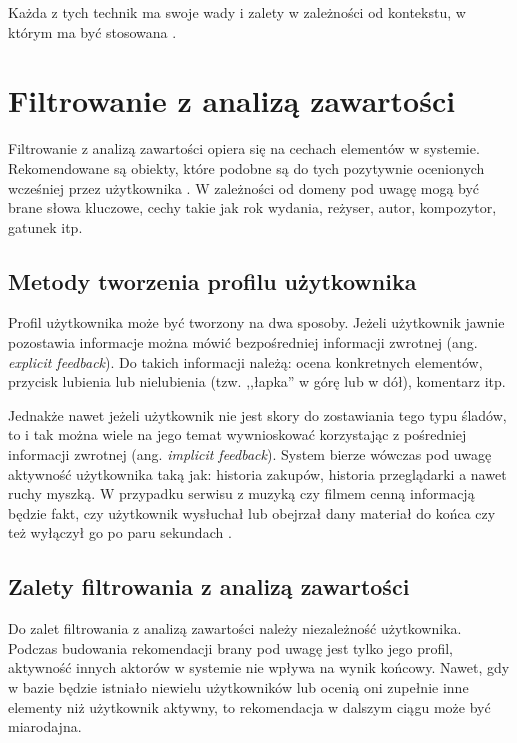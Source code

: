 \documentclass[twoside]{iisthesis}
\begin{document}
	 Każda z tych technik ma swoje wady i zalety w zależności od kontekstu, w którym ma być stosowana \cite{id:IntroductionToRecommenderSystemsHandbook}. 
	 
	 
	 \section{Filtrowanie z analizą zawartości}
	 
	 Filtrowanie z analizą zawartości opiera się na cechach elementów w systemie. Rekomendowane są obiekty, które podobne są do tych pozytywnie ocenionych wcześniej przez użytkownika \cite{id:huynh2012modeling}. W zależności od domeny pod uwagę mogą być brane słowa kluczowe, cechy takie jak rok wydania, reżyser, autor, kompozytor, gatunek itp.
	 
	 \subsection{Metody tworzenia profilu użytkownika}
	 \label{ss:metody_tworzenia_profilu_uzytkownika}
	 
	 Profil użytkownika może być tworzony na dwa sposoby. Jeżeli użytkownik jawnie pozostawia informacje można mówić bezpośredniej informacji zwrotnej (ang. \textit{explicit feedback}). Do takich informacji należą: ocena konkretnych elementów, przycisk lubienia lub nielubienia (tzw. ,,łapka'' w górę lub w dół), komentarz itp. 
	 
	 Jednakże nawet jeżeli użytkownik nie jest skory do zostawiania tego typu śladów, to i tak można wiele na jego temat wywnioskować korzystając z pośredniej informacji zwrotnej (ang. \textit{implicit feedback}). System bierze wówczas pod uwagę aktywność użytkownika taką jak: historia zakupów, historia przeglądarki a nawet ruchy myszką. W przypadku serwisu z muzyką czy filmem cenną informacją będzie fakt, czy użytkownik wysłuchał lub obejrzał dany materiał do końca czy też wyłączył go po paru sekundach \cite{id:AdvancesInCollaborativeFiltering,id:ContentBasedRecommenderSystemsState}.
	 
	 \subsection{Zalety filtrowania z analizą zawartości}
	 
	 Do zalet filtrowania z analizą zawartości należy niezależność użytkownika. Podczas budowania rekomendacji brany pod uwagę jest tylko jego profil, aktywność innych aktorów w systemie nie wpływa na wynik końcowy. Nawet, gdy w bazie będzie istniało niewielu użytkowników lub ocenią oni zupełnie inne elementy niż użytkownik aktywny, to rekomendacja w dalszym ciągu może być miarodajna. 
	 
\end{document}
